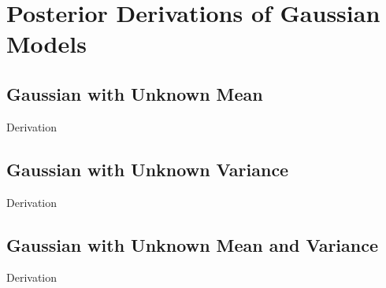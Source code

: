 \chapter{Posterior Derivations of Gaussian Models}\label{sec:Appendix B}

\section{Gaussian with Unknown Mean}

Derivation

\section{Gaussian with Unknown Variance}

Derivation

\section{Gaussian with Unknown Mean and Variance}

Derivation

